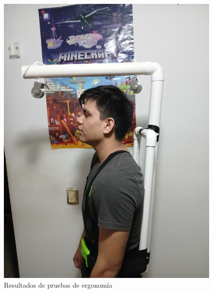 \begin{figure}[H]
    \centering
    \includegraphics[width=1\textwidth, height=.9\textheight]{img/PruebaErgonomica3.png}
    \caption{Resultados de pruebas de ergonomía}
    \label{fig:ergo-test3}
\end{figure}

